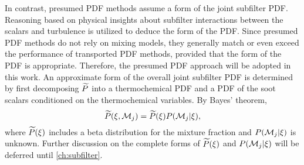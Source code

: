 In contrast, presumed PDF methods assume a form of the joint subfilter PDF. Reasoning based on physical insights about subfilter interactions between the scalars and turbulence is utilized to deduce the form of the PDF. Since presumed PDF methods do not rely on mixing models, they generally match or even exceed the performance of transported PDF methods, provided that the form of the PDF is appropriate. Therefore, the presumed PDF approach will be adopted in this work. An approximate form of the overall joint subfilter PDF is determined by first decomposing $\widetilde{P}$ into a thermochemical PDF and a PDF of the soot scalars conditioned on the thermochemical variables. By Bayes' theorem,
\begin{equation}\label{eq:lesmodels:presumedpdf:bayes}
  \widetilde{P}(\xi,\mathcal{M}_j) = \widetilde{P}(\xi)P(\mathcal{M}_j|\xi),
\end{equation}
where $\widetilde{P}(\xi)$ includes a beta distribution for the mixture fraction and $P(\mathcal{M}_j|\xi)$ is unknown. Further discussion on the complete forms of $\widetilde{P}(\xi)$ and $P(\mathcal{M}_j|\xi)$ will be deferred until \cref{ch:subfilter}.

